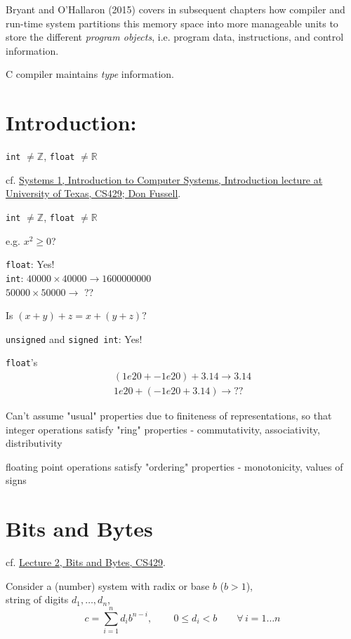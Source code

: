 \documentclass[10pt]{amsart}
\begin{document}
Bryant and O'Hallaron (2015) \cite{BrOH2016} covers in subsequent chapters how compiler and run-time system partitions this memory space into more manageable units to store the different \emph{program objects}, i.e. program data, instructions, and control information.

C compiler maintains \emph{type} information.



\section{Introduction:} 
\texttt{int} $\neq \mathbb{Z}$, \texttt{float} $\neq \mathbb{R}$

cf. \href{https://www.cs.utexas.edu/users/fussell/courses/cs429h/lectures/Lecture_1-429h.pdf}{Systems 1, Introduction to Computer Systems, Introduction lecture at University of Texas, CS429; Don Fussell}.

\texttt{int} $\neq \mathbb{Z}$, \texttt{float} $\neq \mathbb{R}$

e.g. $x^2 \geq 0$? 

\texttt{float}: Yes!  \\
\texttt{int}: $40000 \times 40000 \to 1600000000$ \\
\phantom{int} $50000 \times 50000 \to $ ??

Is $(x+y) + z = x + (y +z)?$

\texttt{unsigned} and \texttt{signed int}: Yes!

\texttt{float}'s 
\[
\begin{gathered}
(1e20 + -1e20) + 3.14 \to 3.14 \\
1e20 + (-1e20 + 3.14) \to ??
\end{gathered}
\]

Can't assume "usual" properties due to finiteness of representations, so that integer operations satisfy "ring" properties
- commutativity, associativity, distributivity

floating point operations satisfy "ordering" properties
- monotonicity, values of signs


\section{Bits and Bytes}

cf. \href{https://www.cs.utexas.edu/users/fussell/courses/cs429h/lectures/Lecture_2-429h.pdf}{Lecture 2, Bits and Bytes, CS429}.

Consider a (number) system with radix or base $b$ ($b>1$), \\
string of digits $d_1, \dots , d_n$, \\
\begin{equation}
c = \sum_{i=1}^n d_i b^{n-i}, \qquad \, 0 \leq d_i < b \qquad \forall \, i = 1 \dots n 
\end{equation}
\end{document}

